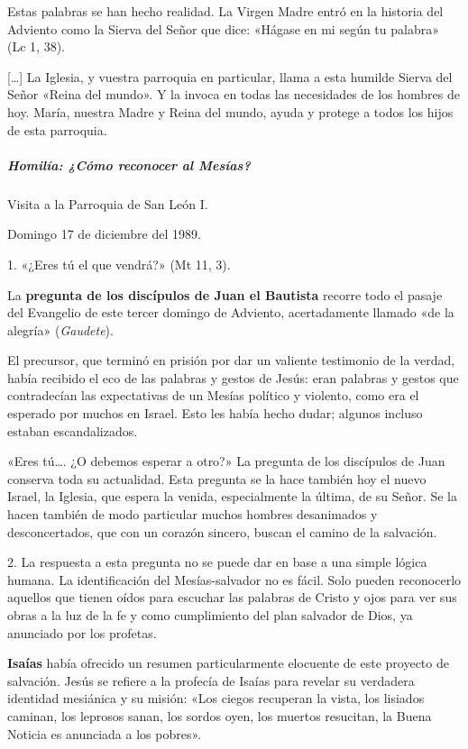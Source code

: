 \documentclass[]{article}
\let\oldsubparagraph\subparagraph
\renewcommand{\subparagraph}[1]{\oldsubparagraph{#1}\mbox{}}
\begin{document}
Estas palabras se han hecho realidad. La Virgen Madre entró en la
historia del Adviento como la Sierva del Señor que dice: «Hágase en mi
según tu palabra» (Lc 1, 38).

{[}\ldots{}{]} La Iglesia, y vuestra parroquia en particular, llama a
esta humilde Sierva del Señor «Reina del mundo». Y la invoca en todas
las necesidades de los hombres de hoy. María, nuestra Madre y Reina del
mundo, ayuda y protege a todos los hijos de esta parroquia.

\subparagraph{Homilía: ¿Cómo reconocer al
Mesías?}\label{homiluxeda-cuxf3mo-reconocer-al-mesuxedas}

Visita a la Parroquia de San León I.

Domingo 17 de diciembre del 1989.

1. «¿Eres tú el que vendrá?» (Mt 11, 3).

La \textbf{pregunta de los discípulos de Juan el Bautista} recorre todo
el pasaje del Evangelio de este tercer domingo de Adviento,
acertadamente llamado «de la alegría» (\emph{Gaudete}).

El precursor, que terminó en prisión por dar un valiente testimonio de
la verdad, había recibido el eco de las palabras y gestos de Jesús: eran
palabras y gestos que contradecían las expectativas de un Mesías
político y violento, como era el esperado por muchos en Israel. Esto les
había hecho dudar; algunos incluso estaban escandalizados.

«Eres tú\ldots{}. ¿O debemos esperar a otro?» La pregunta de los
discípulos de Juan conserva toda su actualidad. Esta pregunta se la hace
también hoy el nuevo Israel, la Iglesia, que espera la venida,
especialmente la última, de su Señor. Se la hacen también de modo
particular muchos hombres desanimados y desconcertados, que con un
corazón sincero, buscan el camino de la salvación.

2. La respuesta a esta pregunta no se puede dar en base a una simple
lógica humana. La identificación del Mesías-salvador no es fácil. Solo
pueden reconocerlo aquellos que tienen oídos para escuchar las palabras
de Cristo y ojos para ver sus obras a la luz de la fe y como
cumplimiento del plan salvador de Dios, ya anunciado por los profetas.

\textbf{Isaías} había ofrecido un resumen particularmente elocuente de
este proyecto de salvación. Jesús se refiere a la profecía de Isaías
para revelar su verdadera identidad mesiánica y su misión: «Los ciegos
recuperan la vista, los lisiados caminan, los leprosos sanan, los sordos
oyen, los muertos resucitan, la Buena Noticia es anunciada a los
pobres».
\end{document}
